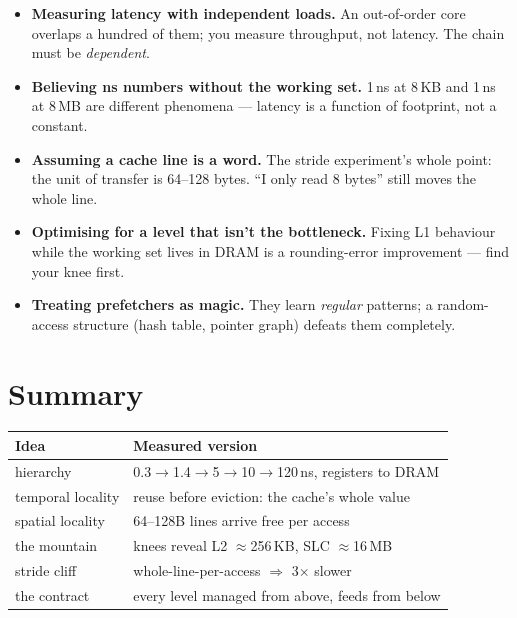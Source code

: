 \begin{itemize}
\item \textbf{Measuring latency with independent loads.} An
      out-of-order core overlaps a hundred of them; you measure
      throughput, not latency. The chain must be \emph{dependent}.
\item \textbf{Believing ns numbers without the working set.} 1\,ns
      at 8\,KB and 1\,ns at 8\,MB are different phenomena ---
      latency is a function of footprint, not a constant.
\item \textbf{Assuming a cache line is a word.} The stride
      experiment's whole point: the unit of transfer is 64--128
      bytes. ``I only read 8 bytes'' still moves the whole line.
\item \textbf{Optimising for a level that isn't the bottleneck.}
      Fixing L1 behaviour while the working set lives in DRAM is a
      rounding-error improvement --- find your knee first.
\item \textbf{Treating prefetchers as magic.} They learn
      \emph{regular} patterns; a random-access structure (hash
      table, pointer graph) defeats them completely.
\end{itemize}

\section{Summary}
\label{sec:summary09}
\begin{tabularx}{\linewidth}{@{}l X@{}}
\toprule
\textbf{Idea} & \textbf{Measured version} \\
\midrule
hierarchy     & 0.3$\to$1.4$\to$5$\to$10$\to$120\,ns, registers to DRAM \\
temporal locality & reuse before eviction: the cache's whole value \\
spatial locality  & 64--128B lines arrive free per access \\
the mountain  & knees reveal L2 $\approx$256\,KB, SLC $\approx$16\,MB \\
stride cliff  & whole-line-per-access $\Rightarrow$ 3$\times$ slower \\
the contract  & every level managed from above, feeds from below \\
\bottomrule
\end{tabularx}

